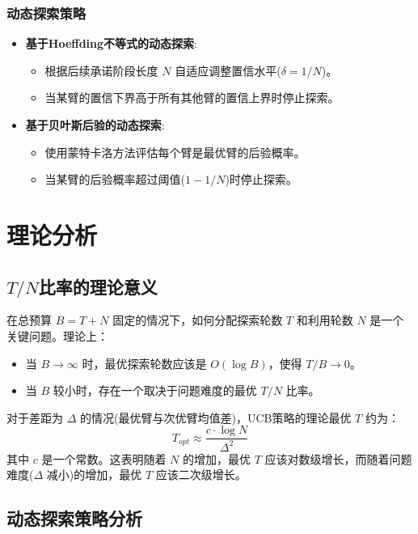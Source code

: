 \documentclass[8pt, a4paper]{ctexart} %
\newcommand{\N}{\ensuremath{N}}
\newcommand{\T}{\ensuremath{T}}
\newcommand{\deltaVal}{\ensuremath{\delta}}
\newcommand{\DeltaVal}{\ensuremath{\Delta}}
\begin{document}
\subsubsection{动态探索策略}
\begin{itemize}
    \item \textbf{基于Hoeffding不等式的动态探索}:
        \begin{itemize}
            \item 根据后续承诺阶段长度 $\N$ 自适应调整置信水平($\deltaVal = 1/\N$)。
            \item 当某臂的置信下界高于所有其他臂的置信上界时停止探索。
        \end{itemize}
    \item \textbf{基于贝叶斯后验的动态探索}:
        \begin{itemize}
            \item 使用蒙特卡洛方法评估每个臂是最优臂的后验概率。
            \item 当某臂的后验概率超过阈值($1-1/\N$)时停止探索。
        \end{itemize}
\end{itemize}



\section{理论分析}

\subsection{$\T/\N$比率的理论意义}

在总预算 $B=\T+\N$ 固定的情况下，如何分配探索轮数 $\T$ 和利用轮数 $\N$ 是一个关键问题。理论上：
\begin{itemize}
    \item 当 $B \to \infty$ 时，最优探索轮数应该是 $O(\log B)$，使得 $\T/B \to 0$。
    \item 当 $B$ 较小时，存在一个取决于问题难度的最优 $\T/\N$ 比率。
\end{itemize}

对于差距为 $\DeltaVal$ 的情况(最优臂与次优臂均值差)，UCB策略的理论最优 $\T$ 约为：
$$
\T_{opt} \approx \frac{c \cdot \log \N}{\DeltaVal^2}
$$
其中 $c$ 是一个常数。这表明随着 $\N$ 的增加，最优 $\T$ 应该对数级增长，而随着问题难度($\DeltaVal$ 减小)的增加，最优 $\T$ 应该二次级增长。

\subsection{动态探索策略分析}
\end{document}
